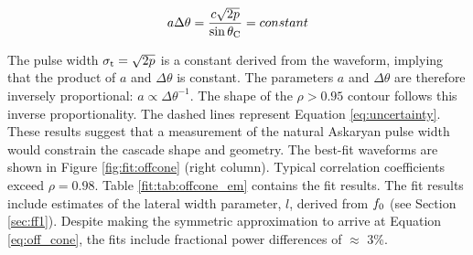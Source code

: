 \documentclass[amsmath,amssymb,aps,prd,10pt,twocolumn]{revtex4}
\begin{document}
\begin{equation}
a \Delta\theta = \frac{c\sqrt{2p}}{\sin\theta_{\rm C}} = constant \label{eq:uncertainty}
\end{equation}

The pulse width $\sigma_{\rm t} = \sqrt{2 p}$ is a constant derived from the waveform, implying that the product of $a$ and $\Delta \theta$ is constant.  The parameters $a$ and $\Delta\theta$ are therefore inversely proportional: $a \propto \Delta\theta^{-1}$.  The shape of the $\rho>0.95$ contour follows this inverse proportionality.  The dashed lines represent Equation \ref{eq:uncertainty}.  These results suggest that a measurement of the natural Askaryan pulse width would constrain the cascade shape and geometry.  The best-fit waveforms are shown in Figure \ref{fig:fit:offcone} (right column).  Typical correlation coefficients exceed $\rho = 0.98$.  Table \ref{fit:tab:offcone_em} contains the fit results.  The fit results include estimates of the lateral width parameter, $l$, derived from $f_{\rm 0}$ (see Section \ref{sec:ff1}).  Despite making the symmetric approximation to arrive at Equation \ref{eq:off_cone}, the fits include fractional power differences of $\approx$ 3\%.
\end{document}

